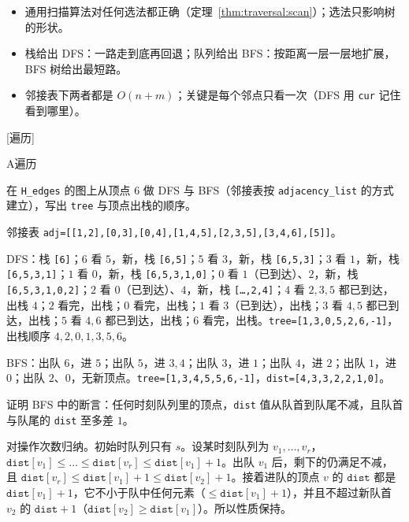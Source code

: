 
\begin{itemize}
\item 通用扫描算法对任何选法都正确（定理~\ref{thm:traversal:scan}）；选法只影响树的形状。
\item 栈给出 DFS：一路走到底再回退；队列给出 BFS：按距离一层一层地扩展，BFS 树给出最短路。
\item 邻接表下两者都是 $O(n+m)$；关键是每个邻点只看一次（DFS 用 \texttt{cur} 记住看到哪里）。
\end{itemize}

[遍历]


\begin{exercises}{A}{遍历}
\item\label{ex:traversal:A1} 在 \texttt{H\_edges} 的图上从顶点 $6$ 做 DFS 与 BFS（邻接表按 \texttt{adjacency\_list} 的方式建立），写出 \texttt{tree} 与顶点出栈的顺序。
\begin{solution}
邻接表 \texttt{adj=[[1,2],[0,3],[0,4],[1,4,5],[2,3,5],[3,4,6],[5]]}。

DFS：栈 \texttt{[6]}；$6$ 看 $5$，新，栈 \texttt{[6,5]}；$5$ 看 $3$，新，栈 \texttt{[6,5,3]}；$3$ 看 $1$，新，栈 \texttt{[6,5,3,1]}；$1$ 看 $0$，新，栈 \texttt{[6,5,3,1,0]}；$0$ 看 $1$（已到达）、$2$，新，栈 \texttt{[6,5,3,1,0,2]}；$2$ 看 $0$（已到达）、$4$，新，栈 \texttt{[\dots,2,4]}；$4$ 看 $2,3,5$ 都已到达，出栈 $4$；$2$ 看完，出栈；$0$ 看完，出栈；$1$ 看 $3$（已到达），出栈；$3$ 看 $4,5$ 都已到达，出栈；$5$ 看 $4,6$ 都已到达，出栈；$6$ 看完，出栈。\texttt{tree=[1,3,0,5,2,6,-1]}，出栈顺序 $4,2,0,1,3,5,6$。

BFS：出队 $6$，进 $5$；出队 $5$，进 $3,4$；出队 $3$，进 $1$；出队 $4$，进 $2$；出队 $1$，进 $0$；出队 $2$、$0$，无新顶点。\texttt{tree=[1,3,4,5,5,6,-1]}，\texttt{dist=[4,3,3,2,2,1,0]}。
\end{solution}

\item\label{ex:traversal:A2} 证明 BFS 中的断言：任何时刻队列里的顶点，\texttt{dist} 值从队首到队尾不减，且队首与队尾的 \texttt{dist} 至多差 $1$。
\begin{solution}
对操作次数归纳。初始时队列只有 $s$。设某时刻队列为 $v_1,\dots,v_r$，$\texttt{dist}[v_1]\leqslant\dots\leqslant\texttt{dist}[v_r]\leqslant\texttt{dist}[v_1]+1$。出队 $v_1$ 后，剩下的仍满足不减，且 $\texttt{dist}[v_r]\leqslant\texttt{dist}[v_1]+1\leqslant\texttt{dist}[v_2]+1$。接着进队的顶点 $v$ 的 $\texttt{dist}$ 都是 $\texttt{dist}[v_1]+1$，它不小于队中任何元素（$\leqslant\texttt{dist}[v_1]+1$），并且不超过新队首 $v_2$ 的 $\texttt{dist}+1$（$\texttt{dist}[v_2]\geqslant\texttt{dist}[v_1]$）。所以性质保持。
\end{solution}


\end{exercises}
